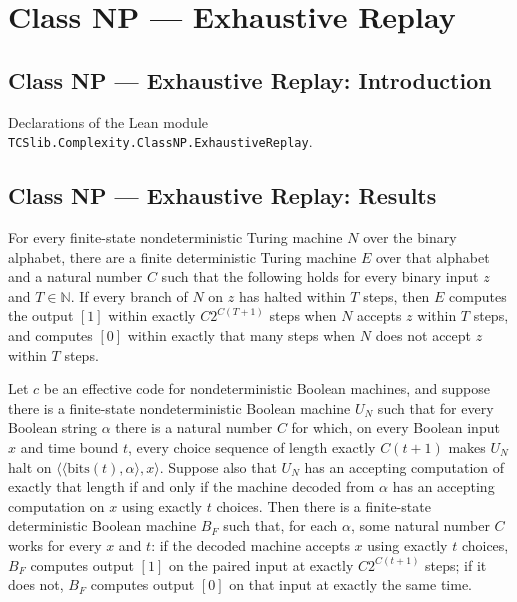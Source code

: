 \section{Class NP --- Exhaustive Replay}
\subsection*{Class NP --- Exhaustive Replay: Introduction}

Declarations of the Lean module \texttt{TCSlib.Complexity.ClassNP.ExhaustiveReplay}.

\subsection*{Class NP --- Exhaustive Replay: Results}

\begin{theorem}
\label{Turing.FinNDTM.exists_exhaustiveDecider}
\leanok
{}
For every finite-state nondeterministic Turing machine $N$ over the binary alphabet,
there are a finite deterministic Turing machine $E$ over that alphabet and a natural
number $C$ such that the following holds for every binary input $z$ and
$T\in\mathbb{N}$. If every branch of $N$ on $z$ has halted within $T$ steps, then $E$
computes the output $[1]$ within exactly $C2^{C(T+1)}$ steps when $N$ accepts $z$ within
$T$ steps, and computes $[0]$ within exactly that many steps when $N$ does not accept
$z$ within $T$ steps.
\end{theorem}

\begin{theorem}
\label{Turing.ndAcceptsWithin_decider_of_universal}
\leanok
{}
Let $c$ be an effective code for nondeterministic Boolean machines, and suppose there is
a finite-state nondeterministic Boolean machine $U_N$ such that for every Boolean string
$\alpha$ there is a natural number $C$ for which, on every Boolean input $x$ and time
bound $t$, every choice sequence of length exactly $C(t+1)$ makes $U_N$ halt on
$\langle\langle\mathrm{bits}(t),\alpha\rangle,x\rangle$. Suppose also that $U_N$ has an
accepting computation of exactly that length if and only if the machine decoded from
$\alpha$ has an accepting computation on $x$ using exactly $t$ choices. Then there is a
finite-state deterministic Boolean machine $B_F$ such that, for each $\alpha$, some
natural number $C$ works for every $x$ and $t$: if the decoded machine accepts $x$ using
exactly $t$ choices, $B_F$ computes output $[1]$ on the paired input at exactly
$C2^{C(t+1)}$ steps; if it does not, $B_F$ computes output $[0]$ on that input at
exactly the same time.
\end{theorem}
